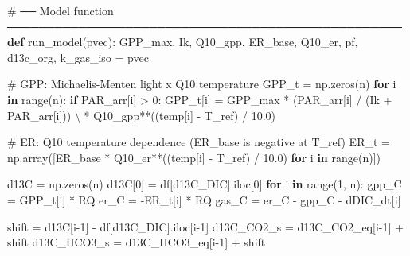 \documentclass[
  letterpaper,
  DIV=11,
  numbers=noendperiod]{scrartcl}
\newenvironment{Shaded}{\begin{snugshade}}{\end{snugshade}}
\newcommand{\BuiltInTok}[1]{\textcolor[rgb]{0.00,0.23,0.31}{#1}}
\newcommand{\CommentTok}[1]{\textcolor[rgb]{0.37,0.37,0.37}{#1}}
\newcommand{\ControlFlowTok}[1]{\textcolor[rgb]{0.00,0.23,0.31}{\textbf{#1}}}
\newcommand{\DecValTok}[1]{\textcolor[rgb]{0.68,0.00,0.00}{#1}}
\newcommand{\FloatTok}[1]{\textcolor[rgb]{0.68,0.00,0.00}{#1}}
\newcommand{\KeywordTok}[1]{\textcolor[rgb]{0.00,0.23,0.31}{\textbf{#1}}}
\newcommand{\NormalTok}[1]{\textcolor[rgb]{0.00,0.23,0.31}{#1}}
\newcommand{\OperatorTok}[1]{\textcolor[rgb]{0.37,0.37,0.37}{#1}}
\newcommand{\StringTok}[1]{\textcolor[rgb]{0.13,0.47,0.30}{#1}}
\begin{document}
\begin{Shaded}
\begin{Highlighting}[]
\CommentTok{\# ── Model function ──────────────────────────────────────────────────}
\KeywordTok{def}\NormalTok{ run\_model(pvec):}
\NormalTok{    GPP\_max, Ik, Q10\_gpp, ER\_base, Q10\_er, pf, d13c\_org, k\_gas\_iso }\OperatorTok{=}\NormalTok{ pvec}

    \CommentTok{\# GPP: Michaelis{-}Menten light x Q10 temperature}
\NormalTok{    GPP\_t }\OperatorTok{=}\NormalTok{ np.zeros(n)}
    \ControlFlowTok{for}\NormalTok{ i }\KeywordTok{in} \BuiltInTok{range}\NormalTok{(n):}
        \ControlFlowTok{if}\NormalTok{ PAR\_arr[i] }\OperatorTok{\textgreater{}} \DecValTok{0}\NormalTok{:}
\NormalTok{            GPP\_t[i] }\OperatorTok{=}\NormalTok{ GPP\_max }\OperatorTok{*}\NormalTok{ (PAR\_arr[i] }\OperatorTok{/}\NormalTok{ (Ik }\OperatorTok{+}\NormalTok{ PAR\_arr[i])) }\OperatorTok{\textbackslash{}}
                       \OperatorTok{*}\NormalTok{ Q10\_gpp}\OperatorTok{**}\NormalTok{((temp[i] }\OperatorTok{{-}}\NormalTok{ T\_ref) }\OperatorTok{/} \FloatTok{10.0}\NormalTok{)}

    \CommentTok{\# ER: Q10 temperature dependence (ER\_base is negative at T\_ref)}
\NormalTok{    ER\_t }\OperatorTok{=}\NormalTok{ np.array([ER\_base }\OperatorTok{*}\NormalTok{ Q10\_er}\OperatorTok{**}\NormalTok{((temp[i] }\OperatorTok{{-}}\NormalTok{ T\_ref) }\OperatorTok{/} \FloatTok{10.0}\NormalTok{)}
                     \ControlFlowTok{for}\NormalTok{ i }\KeywordTok{in} \BuiltInTok{range}\NormalTok{(n)])}

\NormalTok{    d13C }\OperatorTok{=}\NormalTok{ np.zeros(n)}
\NormalTok{    d13C[}\DecValTok{0}\NormalTok{] }\OperatorTok{=}\NormalTok{ df[}\StringTok{\textquotesingle{}d13C\_DIC\textquotesingle{}}\NormalTok{].iloc[}\DecValTok{0}\NormalTok{]}
    \ControlFlowTok{for}\NormalTok{ i }\KeywordTok{in} \BuiltInTok{range}\NormalTok{(}\DecValTok{1}\NormalTok{, n):}
\NormalTok{        gpp\_C }\OperatorTok{=}\NormalTok{ GPP\_t[i] }\OperatorTok{*}\NormalTok{ RQ}
\NormalTok{        er\_C  }\OperatorTok{=} \OperatorTok{{-}}\NormalTok{ER\_t[i] }\OperatorTok{*}\NormalTok{ RQ}
\NormalTok{        gas\_C }\OperatorTok{=}\NormalTok{ er\_C }\OperatorTok{{-}}\NormalTok{ gpp\_C }\OperatorTok{{-}}\NormalTok{ dDIC\_dt[i]}

\NormalTok{        shift       }\OperatorTok{=}\NormalTok{ d13C[i}\OperatorTok{{-}}\DecValTok{1}\NormalTok{] }\OperatorTok{{-}}\NormalTok{ df[}\StringTok{\textquotesingle{}d13C\_DIC\textquotesingle{}}\NormalTok{].iloc[i}\OperatorTok{{-}}\DecValTok{1}\NormalTok{]}
\NormalTok{        d13C\_CO2\_s  }\OperatorTok{=}\NormalTok{ d13C\_CO2\_eq[i}\OperatorTok{{-}}\DecValTok{1}\NormalTok{] }\OperatorTok{+}\NormalTok{ shift}
\NormalTok{        d13C\_HCO3\_s }\OperatorTok{=}\NormalTok{ d13C\_HCO3\_eq[i}\OperatorTok{{-}}\DecValTok{1}\NormalTok{] }\OperatorTok{+}\NormalTok{ shift}


\end{Highlighting}
\end{Shaded}
\end{document}
